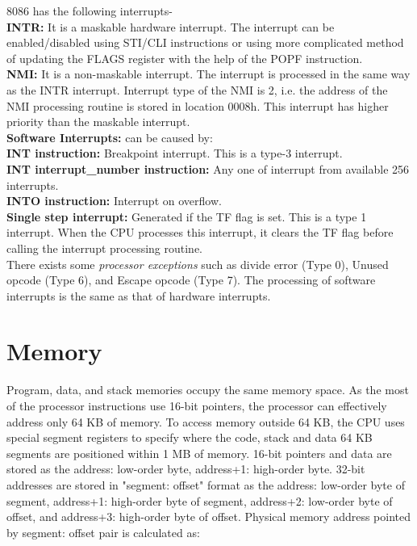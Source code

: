 \documentclass[12pt, a4paper]{scrartcl}
\begin{document}
	8086 has the following interrupts-\\

	\textbf{INTR: }It is a maskable hardware interrupt. The interrupt can be enabled/disabled using STI/CLI instructions or using more complicated method of updating the FLAGS register with the help of the POPF instruction.\\

	\textbf{NMI: }It is a non-maskable interrupt. The interrupt is processed in the same way as the INTR interrupt. Interrupt type of the NMI is 2, i.e. the address of the NMI processing routine is stored in location 0008h. This interrupt has higher priority than the maskable interrupt.\\

	\textbf{Software Interrupts: }can be caused by: \\

	\textbf{INT instruction: }Breakpoint interrupt. This is a type-3 interrupt.\\

	\textbf{INT interrupt\_number instruction: }Any one of interrupt from available 256 interrupts. \\

	\textbf{INTO instruction: }Interrupt on overflow.\\

	\textbf{Single step interrupt: }Generated if the TF flag is set. This is a type 1 interrupt. When the CPU processes this interrupt, it clears the TF flag before calling the interrupt processing routine. \\

	There exists some \textit{processor exceptions} such as divide error (Type 0), Unused opcode (Type 6), and Escape opcode (Type 7). The processing of software interrupts is the same as that of hardware interrupts.

\section{Memory}
	Program, data, and stack memories occupy the same memory space. As the most of the processor instructions use 16-bit pointers, the processor can effectively address only 64 KB of memory. To access memory outside 64 KB, the CPU uses special segment registers to specify where the code, stack and data 64 KB segments are positioned within 1 MB of memory. 16-bit pointers and data are stored as the address: low-order byte, address+1: high-order byte. 32-bit addresses are stored in "segment: offset" format as the address: low-order byte of segment, address+1: high-order byte of segment, address+2: low-order byte of offset, and address+3: high-order byte of offset. Physical memory address pointed by segment: offset pair is calculated as:\\
\end{document}
